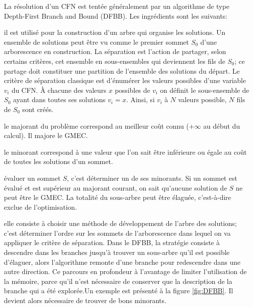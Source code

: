 La résolution d'un CFN est tentée généralement par un algorithme de type  \og Depth-First Branch and Bound \fg (DFBB). Les ingrédients sont les suivants:
\begin{description}[leftmargin=*] 
\item [Un principe de séparation:] il est utilisé pour la construction d'un arbre qui organise les solutions. Un ensemble de solutions peut être vu comme le premier sommet $S_0$ d'une arborescence en construction. La séparation est l'action de partager, selon certains critères, cet ensemble en sous-ensembles  qui deviennent les fils de $S_0$; ce partage doit constituer une partition de l'ensemble des solutions du départ. Le critère de séparation classique est d'énumérer les valeurs possibles d'une variable $v_i$ du  CFN. À chacune des valeurs $x$ possibles de $v_i$ on définit le sous-ensemble de $S_0$ ayant dans toutes ses solutions $v_i=x$. Ainsi, si $v_i$ à $N$ valeurs possible, $N$ fils de $S_0$ sont créés.
\item [Un majorant:] le majorant du problème correspond au meilleur coût connu ($+\infty$ au début du calcul). Il majore le GMEC.
\item [Un minorant d'un sommet:] le minorant correspond à une valeur que l'on sait être inférieure ou égale au coût de toutes les solutions d'un sommet.  
\item [Un principe d'évaluation:] évaluer un sommet $S$, c'est déterminer un de ses minorants. Si un sommet est évalué et est supérieur au majorant courant, on sait qu'aucune solution de $S$ ne peut être le GMEC. La totalité du sous-arbre peut être élaguée, c'est-à-dire exclue de l'optimisation.  
\item [Une stratégie de développement:] elle consiste à choisir une méthode de développement de l'arbre des solutions; c'est déterminer l'ordre sur les sommets de l'arborescence dans lequel on va appliquer le critère de séparation. Dans le DFBB, la stratégie consiste à descendre dans les branches jusqu'à trouver un sous-arbre qu'il est possible d'élaguer, alors l'algorithme remonte d'une branche pour redescendre dans une autre direction. Ce parcours en profondeur à l'avantage de limiter l'utilisation de la mémoire, parce qu'il n'est nécessaire de conserver que la description de la branche qui a été explorée.Un exemple est présenté à la figure \ref{fig:DFBB}. Il devient alors nécessaire de trouver de bons minorants.
\end{description}  


